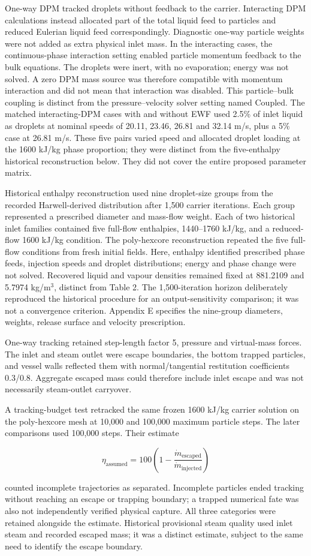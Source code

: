 One-way DPM tracked droplets without feedback to the carrier. Interacting DPM calculations instead allocated part of the total liquid feed to particles and reduced Eulerian liquid feed correspondingly. Diagnostic one-way particle weights were not added as extra physical inlet mass. In the interacting cases, the continuous-phase interaction setting enabled particle momentum feedback to the bulk equations. The droplets were inert, with no evaporation; energy was not solved. A zero DPM mass source was therefore compatible with momentum interaction and did not mean that interaction was disabled. This particle--bulk coupling is distinct from the pressure--velocity solver setting named Coupled. The matched interacting-DPM cases with and without EWF used 2.5\% of inlet liquid as droplets at nominal speeds of 20.11, 23.46, 26.81 and 32.14 m/s, plus a 5\% case at 26.81 m/s. These five pairs varied speed and allocated droplet loading at the 1600 kJ/kg phase proportion; they were distinct from the five-enthalpy historical reconstruction below. They did not cover the entire proposed parameter matrix.

Historical enthalpy reconstruction used nine droplet-size groups from the recorded Harwell-derived distribution after 1,500 carrier iterations. Each group represented a prescribed diameter and mass-flow weight. Each of two historical inlet families contained five full-flow enthalpies, 1440--1760 kJ/kg, and a reduced-flow 1600 kJ/kg condition. The poly-hexcore reconstruction repeated the five full-flow conditions from fresh initial fields. Here, enthalpy identified prescribed phase feeds, injection speeds and droplet distributions; energy and phase change were not solved. Recovered liquid and vapour densities remained fixed at 881.2109 and 5.7974 kg/m\(^{3}\), distinct from Table 2. The 1,500-iteration horizon deliberately reproduced the historical procedure for an output-sensitivity comparison; it was not a convergence criterion. Appendix E specifies the nine-group diameters, weights, release surface and velocity prescription.

One-way tracking retained step-length factor 5, pressure and virtual-mass forces. The inlet and steam outlet were escape boundaries, the bottom trapped particles, and vessel walls reflected them with normal/tangential restitution coefficients 0.3/0.8. Aggregate escaped mass could therefore include inlet escape and was not necessarily steam-outlet carryover.

A tracking-budget test retracked the same frozen 1600 kJ/kg carrier solution on the poly-hexcore mesh at 10,000 and 100,000 maximum particle steps. The later comparisons used 100,000 steps. Their estimate

\[\eta_{\mathrm{assumed}}=100\left(1-\frac{\dot m_{\mathrm{escaped}}}{\dot m_{\mathrm{injected}}}\right)\]

counted incomplete trajectories as separated. Incomplete particles ended tracking without reaching an escape or trapping boundary; a trapped numerical fate was also not independently verified physical capture. All three categories were retained alongside the estimate. Historical provisional steam quality used inlet steam and recorded escaped mass; it was a distinct estimate, subject to the same need to identify the escape boundary.
